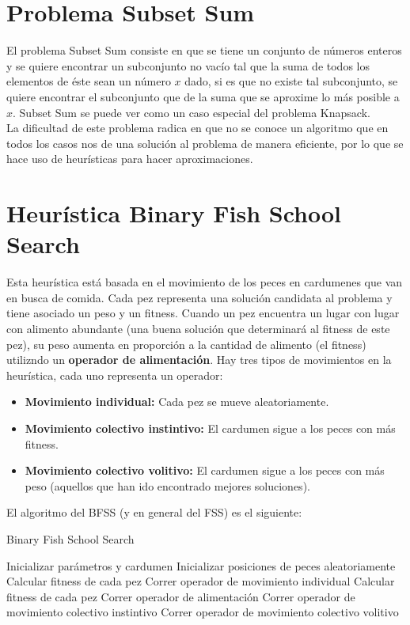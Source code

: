 \documentclass[12pt]{article}
\begin{document}
\newpage

\section{Problema Subset Sum} \label{sec:ss}
El problema Subset Sum consiste en que se tiene un conjunto de números enteros y se quiere encontrar un subconjunto no vacío tal que la suma de todos los elementos de éste sean un número $x$ dado, si es que no existe tal subconjunto, se quiere encontrar el subconjunto que de la suma que se aproxime lo más posible a $x$. Subset Sum se puede ver como un caso especial del problema Knapsack. \\

La dificultad de este problema radica en que no se conoce un algoritmo que en todos los casos nos de una solución al problema de manera eficiente, por lo que se hace uso de heurísticas para hacer aproximaciones.

\section{Heurística Binary Fish School Search } \label{sec:bfss} 
Esta heurística está basada en el movimiento de los peces en cardumenes que van en busca de comida. Cada pez representa una solución candidata al problema y tiene asociado un peso y un fitness. Cuando un pez encuentra un lugar con lugar con alimento abundante (una buena solución que determinará al fitness de este pez), su peso aumenta en proporción a la cantidad de alimento (el fitness) utilizndo un \textbf{operador de alimentación}. Hay tres tipos de movimientos en la heurística, cada uno representa un operador:
\begin{itemize}
\item \textbf{Movimiento individual:} Cada pez se mueve aleatoriamente.
\item \textbf{Movimiento colectivo instintivo:} El cardumen sigue a los peces con más fitness.
\item \textbf{Movimiento colectivo volitivo:} El cardumen sigue a los peces con más peso (aquellos que han ido encontrado mejores soluciones).
\end{itemize}

El algoritmo del BFSS (y en general del FSS) es el siguiente: 

\begin{algorithm}                     
\caption{Binary Fish School Search}         
\label{alg1}                           
\begin{algorithmic}
	\STATE Inicializar parámetros y cardumen
  	\STATE Inicializar posiciones de peces aleatoriamente
        	\STATE Calcular fitness de cada pez
        	\STATE Correr operador de movimiento individual
                \STATE Calcular fitness de cada pez
                \STATE Correr operador de alimentación
                \STATE Correr operador de movimiento colectivo instintivo
                \STATE Correr operador de movimiento colectivo volitivo
	\ENDWHILE
\end{algorithmic}
\end{algorithm}
\end{document}
